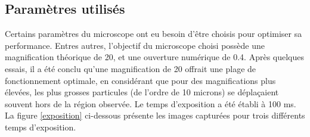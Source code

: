 \documentclass[11pt,letterpaper]{article}
\begin{document}
\subsection{Paramètres utilisés \label{para}}
Certains paramètres du microscope ont eu besoin d'être choisis pour optimiser sa performance. Entres autres,
l'objectif du microscope choisi possède une magnification théorique de 20, et une ouverture numérique de 0.4. Après quelques essais, 
il a été conclu qu'une magnification de 20 offrait une plage de fonctionnement optimale, en considérant 
que pour des magnifications plus élevées, les plus grosses particules (de l'ordre de 10 microns) se déplaçaient souvent hors de la région observée. 
Le temps d'exposition a été établi à 100 ms. La figure \ref{exposition} ci-dessous présente les images
capturées pour trois différents temps d'exposition.
\end{document}
